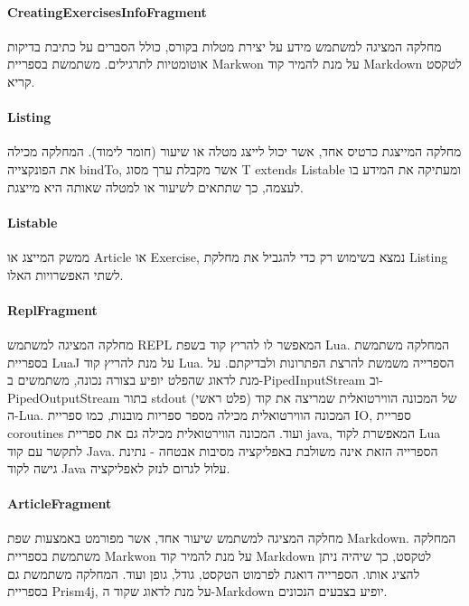 \paragraph{CreatingExercisesInfoFragment}

מחלקה המציגה למשתמש מידע על יצירת מטלות בקורס,
כולל הסברים על כתיבת בדיקות אוטומטיות לתרגילים.
משתמשת בספריית Markwon על מנת להמיר קוד Markdown לטקסט קריא.

\paragraph{Listing}

מחלקה המייצגת כרטיס אחד, אשר יכול לייצג מטלה או שיעור (חומר לימוד).
המחלקה מכילה את הפונקצייה bindTo, אשר מקבלת ערך מסוג T extends Listable ומעתיקה את המידע בו לעצמה, כך שתתאים לשיעור או למטלה שאותה היא מייצגת.


\paragraph{Listable}

ממשק המייצג או Article או Exercise, נמצא בשימוש רק כדי להגביל את מחלקת Listing לשתי האפשרויות האלו.

\paragraph{ReplFragment}

מחלקה המציגה למשתמש REPL המאפשר לו להריץ קוד בשפת Lua.
המחלקה משתמשת בספריית LuaJ על מנת להריץ קוד Lua.
הספרייה משמשת להרצת הפתרונות ולבדיקתם.
על מנת לדאוג שהפלט יופיע בצורה נכונה, משתמשים ב-PipedInputStream וב-PipedOutputStream בתור stdout (פלט ראשי) של המכונה הווירטואלית שמריצה את קוד ה-Lua.
המכונה הווירטואלית מכילה מספר ספריות מובנות, כמו ספריית IO, ספריית coroutines ועוד.
המכונה הווירטואלית מכילה גם את ספריית java, המאפשרת לקוד Lua לתקשר עם קוד Java.
הספרייה הזאת אינה משולבת באפליקציה מסיבות אבטחה - נתינת גישה לקוד Java עלול לגרום לנזק לאפליקציה.

\paragraph{ArticleFragment}

מחלקה המציגה למשתמש שיעור אחד, אשר מפורמט באמצעות שפת Markdown.
המחלקה משתמשת בספריית Markwon על מנת להמיר קוד Markdown לטקסט, כך שיהיה ניתן להציג אותו.
הספרייה דואגת לפרמוט הטקסט, גודל, גופן ועוד.
המחלקה משתמשת גם בספריית Prism4j, על מנת לדאוג שקוד ה-Markdown יופיע בצבעים הנכונים.

